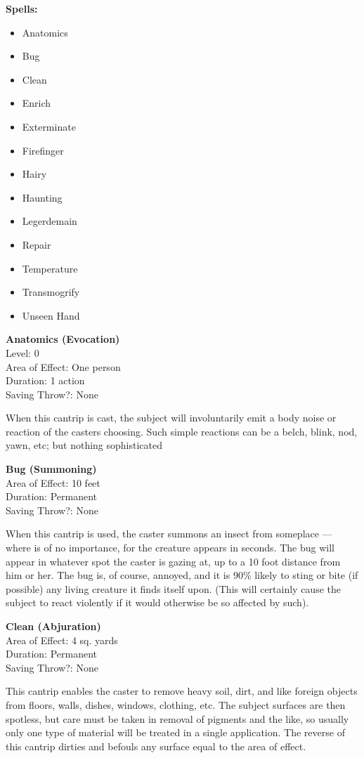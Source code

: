 \documentclass[letterpaper,sansserif,tightsqueeze]{rpg-module}
\begin{document}
\textbf{Spells:}
\begin{itemize}
	\item Anatomics
	\item Bug
	\item Clean
	\item Enrich
	\item Exterminate
	\item Firefinger
	\item Hairy
	\item Haunting
	\item Legerdemain
	\item Repair
	\item Temperature
	\item Transmogrify
	\item Unseen Hand
\end{itemize}
\textbf{Anatomics (Evocation)}\\
Level: 0\\
Area of Effect: One person\\
Duration: 1 action\\
Saving Throw?: None
	
When this cantrip is cast, the subject will involuntarily emit a body noise or reaction of the casters choosing. Such simple reactions can be a belch, blink, nod, yawn, etc; but nothing sophisticated
	
\textbf{Bug (Summoning)}\\
Area of Effect: 10 feet\\
Duration: Permanent\\
Saving Throw?: None

When this cantrip is used, the caster summons an insect from someplace — where is of no importance, for the creature appears in seconds. The bug will appear in whatever spot the caster is gazing at, up to a 10 foot distance from him or her. The bug is, of course, annoyed, and it is 90\% likely to sting or bite (if possible) any living creature it finds itself upon. (This will certainly cause the subject to react violently if it would otherwise be so affected by such).
	
\textbf{Clean (Abjuration)}\\
Area of Effect: 4 sq. yards\\
Duration: Permanent\\
Saving Throw?: None
	
This cantrip enables the caster to remove heavy soil, dirt, and like foreign objects from floors, walls, dishes, windows, clothing, etc. The subject surfaces are then spotless, but care must be taken in removal of pigments and the like, so usually only one type of material will be treated in a single application. The reverse of this cantrip dirties and befouls any surface equal to the area of effect.
	
\end{document}
